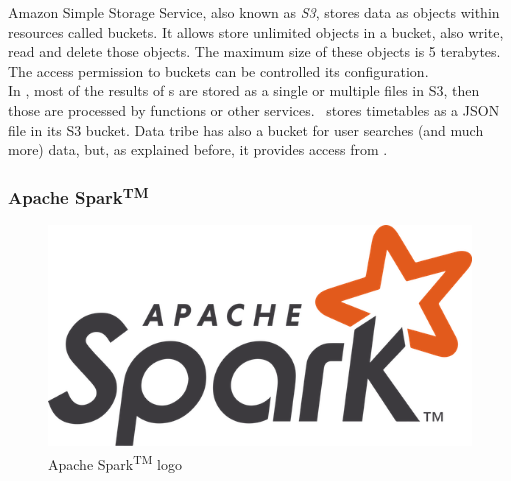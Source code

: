 Amazon Simple Storage Service\cite{s3}, also known as \textit{S3}, stores data as objects within resources called buckets. It allows store unlimited objects in a bucket, also write, read and delete those objects. The maximum size of these objects is 5 terabytes. The access permission to buckets can be controlled its configuration.
\\
In \company, most of the results of s are stored as a single or multiple files in S3, then those are processed by  functions or other services. \squad\ stores timetables as a JSON\cite{json} file in its S3 bucket. Data tribe has also a bucket for user searches (and much more) data, but, as explained before, it provides access from .

\subsubsection*{Apache Spark\textsuperscript{TM}} \label{apache_spark}

\begin{figure}[H]
\centering
\includegraphics[scale=0.1]{resources/apache-spark_logo.png}
\caption{Apache Spark\textsuperscript{TM} logo}
\end{figure}

